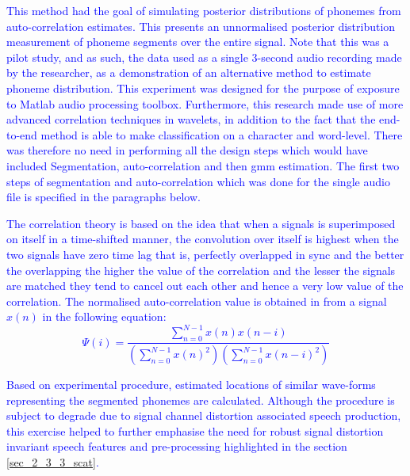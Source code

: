 \textcolor{blue}{This method had the goal of simulating posterior distributions of phonemes from auto-correlation estimates.  This presents an unnormalised posterior distribution measurement of phoneme segments over the entire signal.  Note that this was a pilot study, and as such, the data used as a single 3-second audio recording made by the researcher, as a demonstration of an alternative method to estimate phoneme distribution.  This experiment was designed for the purpose of exposure to Matlab audio processing toolbox. Furthermore, this research made use of more advanced correlation techniques in wavelets, in addition to the fact that the end-to-end method is able to make classification on a character and word-level.  There was therefore no need in performing all the design steps which would have included Segmentation, auto-correlation and then \acrfull{gmm} estimation.  The first two steps of segmentation and auto-correlation which was done for the single audio file is specified in the paragraphs below.

The correlation theory is based on the idea that when a signals is superimposed on itself in a time-shifted manner, the convolution over itself is highest when the two signals have zero time lag that is, perfectly overlapped in sync and the better the overlapping the higher the value of the correlation and the lesser the signals are matched they tend to cancel out each other and hence a very low value of the correlation.  The normalised auto-correlation value is obtained in \cite{picone1996fundamentals} from a signal $x(n)$ in the following equation:
\begin{equation}
    \Psi(i)=\frac{\sum_{n=0}^{N-1}x(n)x(n-i)}{\left(\sum_{n=0}^{N-1}x(n)^2\right)\left(\sum_{n=0}^{N-1}x(n-i)^2\right)}\label{c3eq_corr}
\end{equation}

Based on experimental procedure, estimated locations of similar wave-forms representing the segmented phonemes are calculated.  Although the procedure is subject to degrade due to signal channel distortion associated speech production, this exercise helped to further emphasise the need for robust signal distortion invariant speech features and pre-processing highlighted in the section \ref{sec_2_3_3_scat}.}

